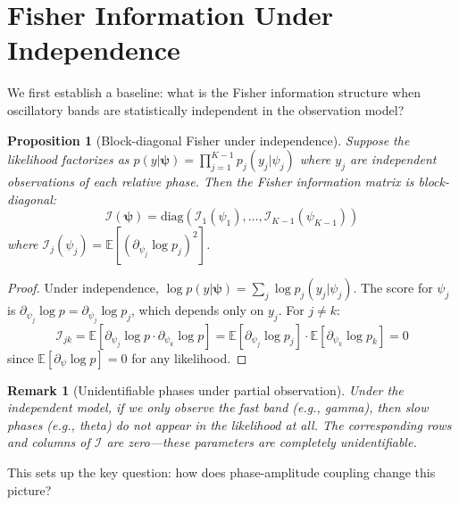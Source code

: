 \documentclass[12pt]{article}
\newtheorem{proposition}[theorem]{Proposition}
\newtheorem{remark}[theorem]{Remark}
\newcommand{\E}{\mathbb{E}}
\newcommand{\FIM}{\mathcal{I}}
\begin{document}
\section{Fisher Information Under Independence}
\label{sec:independence}

We first establish a baseline: what is the Fisher information structure when oscillatory bands are statistically independent in the observation model?

\begin{proposition}[Block-diagonal Fisher under independence]
\label{prop:diagonal}
Suppose the likelihood factorizes as $p(y|\bm{\psi}) = \prod_{j=1}^{K-1} p_j(y_j|\psi_j)$ where $y_j$ are independent observations of each relative phase. Then the Fisher information matrix is block-diagonal:
\begin{equation}
\FIM(\bm{\psi}) = \mathrm{diag}(\FIM_1(\psi_1), \ldots, \FIM_{K-1}(\psi_{K-1}))
\end{equation}
where $\FIM_j(\psi_j) = \E[(\partial_{\psi_j} \log p_j)^2]$.
\end{proposition}

\begin{proof}
Under independence, $\log p(y|\bm{\psi}) = \sum_j \log p_j(y_j|\psi_j)$. The score for $\psi_j$ is $\partial_{\psi_j} \log p = \partial_{\psi_j} \log p_j$, which depends only on $y_j$. For $j \neq k$:
\begin{equation}
\FIM_{jk} = \E[\partial_{\psi_j} \log p \cdot \partial_{\psi_k} \log p] = \E[\partial_{\psi_j} \log p_j] \cdot \E[\partial_{\psi_k} \log p_k] = 0
\end{equation}
since $\E[\partial_\psi \log p] = 0$ for any likelihood.
\end{proof}

\begin{remark}[Unidentifiable phases under partial observation]
Under the independent model, if we only observe the fast band (e.g., gamma), then slow phases (e.g., theta) do not appear in the likelihood at all. The corresponding rows and columns of $\FIM$ are zero---these parameters are \emph{completely unidentifiable}.
\end{remark}

This sets up the key question: how does phase-amplitude coupling change this picture?

\end{document}
